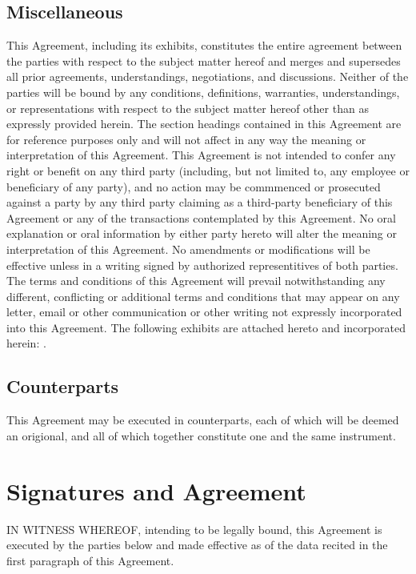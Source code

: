 \documentclass[letterpaper,10pt,english]{sphinxmanual}
\begin{document}
\subsection{Miscellaneous}
\label{\detokenize{7-miscellaneous:id1}}
This Agreement, including its exhibits, constitutes the entire agreement between the parties with respect to the subject matter hereof and merges and supersedes all prior agreements, understandings, negotiations, and discussions. Neither of the parties will be bound by any conditions, definitions, warranties, understandings, or representations with respect to the subject matter hereof other than as expressly provided herein. The section headings contained in this Agreement are for reference purposes only and will not affect in any way the meaning or interpretation of this Agreement. This Agreement is not intended to confer any right or benefit on any third party (including, but not limited to, any employee or beneficiary of any party), and no action may be commmenced or prosecuted against a party by any third party claiming as a third-party beneficiary of this Agreement or any of the transactions contemplated by this Agreement. No oral explanation or oral information by either party hereto will alter the meaning or interpretation of this Agreement. No amendments or modifications will be effective unless in a writing signed by authorized representitives of both parties. The terms and conditions of this Agreement will prevail notwithstanding any different, conflicting or additional terms and conditions that may appear on any letter, email or other communication or other writing not expressly incorporated into this Agreement. The following exhibits are attached hereto and incorporated herein: .


\subsection{Counterparts}
\label{\detokenize{7-miscellaneous:counterparts}}
This Agreement may be executed in counterparts, each of which will be deemed an origional, and all of which together constitute one and the same instrument.


\section{Signatures and Agreement}
\label{\detokenize{8-agreed:signatures-and-agreement}}\label{\detokenize{8-agreed::doc}}
IN WITNESS WHEREOF, intending to be legally bound, this Agreement is executed by the parties below and made effective as of the data recited in the first paragraph of this Agreement.
\end{document}
